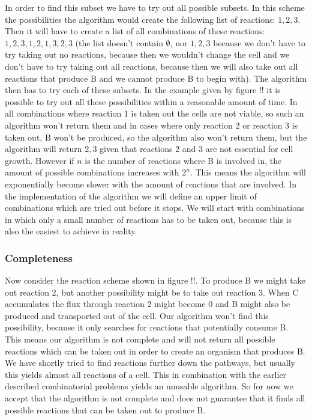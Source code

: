 \documentclass[12pt]{report}
\begin{document}
In order to find this subset we have to try out all possible subsets. In this scheme the possibilities the algorithm would create the following list of reactions: ${1, 2, 3}$.
Then it will have to create a list of all combinations of these reactions: ${{1},{2},{3},{1,2},{1,3},{2,3}}$ (the list doesn't contain $\emptyset$, nor ${1,2,3}$ because we don't have to try taking out no reactions, because then we wouldn't change the cell and we don't have to try taking out all reactions, because then we will also take out all reactions that produce B and we cannot produce B to begin with).
The algorithm then has to try each of these subsets.
In the example given by figure !! it is possible to try out all these possibilities within a reasonable amount of time.
In all combinations where reaction 1 is taken out the cells are not viable, so such an algorithm won't return them and in cases where only reaction 2 or reaction 3 is taken out, B won't be produced, so the algorithm also won't return them, but the algorithm will return ${2,3}$ given that reactions 2 and 3 are not essential for cell growth.
However if $n$ is the number of reactions where B is involved in, the amount of possible combinations increases with $2^n$.
This means the algorithm will exponentially become slower with the amount of reactions that are involved.
In the implementation of the algorithm we will define an upper limit of combinations which are tried out before it stops. We will start with combinations in which only a small number of reactions has to be taken out, because this is also the easiest to achieve in reality.

\subsubsection{Completeness}
Now consider the reaction scheme shown in figure !!.
To produce B we might take out reaction 2, but another possibility might be to take out reaction 3.
When C accumulates the flux through reaction 2 might become 0 and B might also be produced and transported out of the cell.
Our algorithm won't find this possibility, because it only searches for reactions that potentially consume B.
This means our algorithm is not complete and will not return all possible reactions which can be taken out in order to create an organism that produces B.
We have shortly tried to find reactions further down the pathways, but usually this yields almost all reactions of a cell.
This in combination with the earlier described combinatorial problems yields an unusable algorithm.
So for now we accept that the algorithm is not complete and does not guarantee that it finds all possible reactions that can be taken out to produce B.
\end{document}
